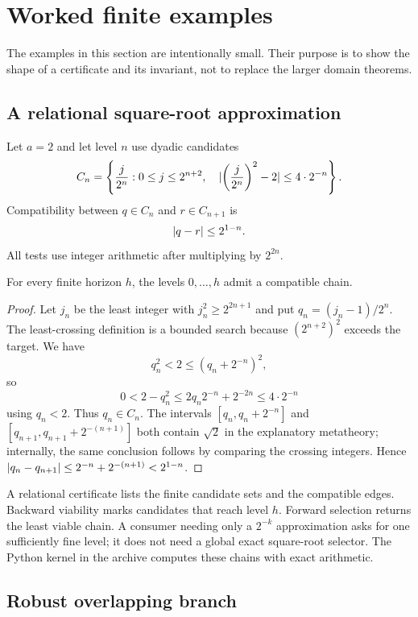 \section{Worked finite examples}
\label{sec:examples}

The examples in this section are intentionally small.  Their purpose is to show the shape of a certificate and its invariant, not to replace the larger domain theorems.

\subsection{A relational square-root approximation}

Let $a=2$ and let level $n$ use dyadic candidates
\[
 C_n=\left\{\frac{j}{2^n}:0\le j\le 2^{n+2},\quad
 \lvert \left(\frac{j}{2^n}\right)^2-2\rvert\le 4\cdot2^{-n}\right\}.
\]
Compatibility between $q\in C_n$ and $r\in C_{n+1}$ is
\[
 \lvert q-r\rvert\le 2^{1-n}.
\]
All tests use integer arithmetic after multiplying by $2^{2n}$.

\begin{proposition}
For every finite horizon $h$, the levels $0,\ldots,h$ admit a compatible chain.
\end{proposition}

\begin{proof}
Let $j_n$ be the least integer with $j_n^2\ge2^{2n+1}$ and put $q_n=(j_n-1)/2^n$.  The least-crossing definition is a bounded search because $(2^{n+2})^2$ exceeds the target.  We have
\[
 q_n^2<2\le(q_n+2^{-n})^2,
\]
so
\[
 0<2-q_n^2\le 2q_n2^{-n}+2^{-2n}\le4\cdot2^{-n}
\]
using $q_n<2$.  Thus $q_n\in C_n$.  The intervals
$[q_n,q_n+2^{-n}]$ and $[q_{n+1},q_{n+1}+2^{-(n+1)}]$ both contain $\sqrt2$ in the explanatory metatheory; internally, the same conclusion follows by comparing the crossing integers.  Hence $\lvert q_n-q_{n+1}\rvert\le2^{-n}+2^{-(n+1)}<2^{1-n}$.
\end{proof}

A relational certificate lists the finite candidate sets and the compatible edges.  Backward viability marks candidates that reach level $h$.  Forward selection returns the least viable chain.  A consumer needing only a $2^{-k}$ approximation asks for one sufficiently fine level; it does not need a global exact square-root selector.  The Python kernel in the archive computes these chains with exact  arithmetic.

\subsection{Robust overlapping branch}

